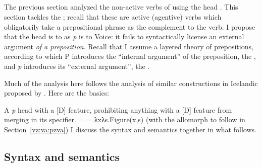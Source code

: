 \begin{exe}
\begin{xlist}
\begin{xlist}
\begin{exe}
\begin{xlist}
\begin{xlist}
\begin{exe}
\begin{xlist}
\begin{xlist}
\begin{exe}
\begin{exe}
\begin{xlist}
\begin{exe}
\begin{exe}
\begin{xlist}
\begin{exe}
\begin{exe}
\begin{exe}
\begin{exe}
\begin{exe}
\begin{xlist}
\begin{exe}
\begin{xlist}
\begin{exe}
\begin{exe}
\begin{xlist}
\begin{exe}
\begin{xlist}
\begin{exe}
\begin{xlist}
\begin{exe}
\begin{exe}
\begin{exe}
\begin{xlist}
\begin{exe}
\begin{exe}
\begin{exe}
\begin{xlist}
\begin{exe}
\begin{xlist}
\begin{exe}
\begin{xlist}
\begin{exe}
\begin{xlist}
\begin{exe}
\begin{exe}
\begin{exe}
\begin{exe}
\begin{xlist}
\begin{exe}
\begin{xlist}
\section{\pz} \label{vz:pz}
The previous section analyzed the non-active verbs of {\tnif} using the head {\vz}. This section tackles the ; recall that these are active (agentive) verbs which obligatorily take a prepositional phrase as the complement to the verb. I propose that the head {\pz} is to {\vz} as \textit{p} is to Voice: it fails to syntactically license an external argument \emph{of a preposition}. Recall that I assume a layered theory of prepositions, according to which P introduces the ``internal argument'' of the preposition, the , and \textit{p} introduces its ``external argument'', the .

Much of the analysis here follows the analysis of similar constructions in Icelandic proposed by \cite{wood15springer}. Here are the basics:
 \begin{exe}
 \ex  \pz
 \begin{xlist} 
 	\ex  A \textit{p} head with a [\textminus{}D] feature, prohibiting anything with a [D] feature from merging in its specifier. 
     \ex  \denote{\pz} =  = λxλs.Figure(x,s) 
 	\ex  {\pz} {\lra} {\tnif} \hfill (with the allomorph {\thit} to follow in\\
 		\phantom{a} \hfill Section~\ref{vz:va:pzva}) 
 \z
\z 
I discuss the syntax and semantics together in what follows.

	\subsection{Syntax and semantics} \label{vz:pz:syn}	

\end{xlist}
\end{exe}
\end{xlist}
\end{exe}
\end{xlist}
\end{exe}
\end{exe}
\end{exe}
\end{exe}
\end{xlist}
\end{exe}
\end{xlist}
\end{exe}
\end{xlist}
\end{exe}
\end{xlist}
\end{exe}
\end{exe}
\end{exe}
\end{xlist}
\end{exe}
\end{exe}
\end{exe}
\end{xlist}
\end{exe}
\end{xlist}
\end{exe}
\end{xlist}
\end{exe}
\end{exe}
\end{xlist}
\end{exe}
\end{xlist}
\end{exe}
\end{exe}
\end{exe}
\end{exe}
\end{exe}
\end{xlist}
\end{exe}
\end{exe}
\end{xlist}
\end{exe}
\end{exe}
\end{xlist}
\end{xlist}
\end{exe}
\end{xlist}
\end{xlist}
\end{exe}
\end{xlist}
\end{xlist}
\end{exe}
